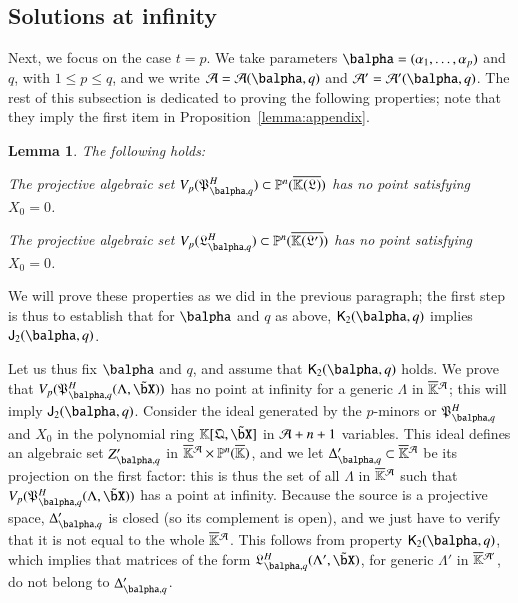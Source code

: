 \documentclass[amsthm]{elsart}
\newtheorem{lemma}[definition]{Lemma}
\begin{document}
\subsection{Solutions at infinity} Next, we focus on the case $t=p$.
We take parameters $\balpha=(\alpha_1,\dots,\alpha_p)$ and $q$, with
$1 \le p \le q$, and we write ${\cal A}={\cal A}(\balpha,q)$ and
${\cal A}'={\cal A}'(\balpha,q)$.  The rest of this subsection is
dedicated to proving the following properties; note that they imply
the first item in Proposition~\ref{lemma:appendix}.

\begin{lemma}The following holds:
\begin{description}[leftmargin=*]
\item[$\assI_2(\balpha,q).$] The projective algebraic set
  $V_p(\mathfrak{P}^H_{\balpha,q}) \subset \P^n(\KKGbar)$ has no point
  satisfying $X_0=0$.
\item[$\assJ_2(\balpha,q).$] The projective algebraic set
  $V_p(\mathfrak{L}^H_{\balpha,q}) \subset \P^n(\KKGpbar)$ has no point
  satisfying $X_0=0$.
\end{description}
\end{lemma}
We will prove these properties as we did in the previous paragraph;
the first step is thus to establish that for $\balpha$ and $q$ as
above, $\assJ_2(\balpha,q)$ implies $\assI_2(\balpha,q)$.

Let us thus fix $\balpha$ and $q$, and assume that
$\assJ_2(\balpha,q)$ holds. We prove that
$V_p(\mathfrak{P}^H_{\balpha,q}(\Lambda,\tilde\bX))$ has no point at
infinity for a generic $\Lambda$ in $\KKbar{}^{\cal A}$; this will
imply $\assI_2(\balpha,q)$. Consider the ideal generated by the
$p$-minors or $\mathfrak{P}^H_{\balpha,q}$ and $X_0$ in the polynomial
ring $\KK[\mathfrak{Q},\tilde\bX]$ in ${\cal A}+n+1$ variables. This
ideal defines an algebraic set $Z'_{\balpha,q}$ in $\KKbar{}^{\cal A}
\times \P^n(\KKbar)$, and we let $\Delta'_{\balpha,q} \subset
\KKbar{}^{\cal A}$ be its projection on the first factor: this is thus
the set of all $\Lambda$ in $\KKbar{}^{\cal A}$ such that
$V_p(\mathfrak{P}^H_{\balpha,q}(\Lambda,\tilde\bX))$ has a point at
infinity. Because the source is a projective space,
$\Delta'_{\balpha,q}$ is closed (so its complement is open), and we
just have to verify that it is not equal to the whole $\KKbar{}^{\cal
  A}$. This follows from property $\assJ_2(\balpha,q)$, which implies
that matrices of the form
$\mathfrak{L}^H_{\balpha,q}(\Lambda',\tilde\bX)$, for generic
$\Lambda'$ in $\KKbar{}^{{\cal A}'}$, do not belong to
$\Delta'_{\balpha,q}$.
\end{document}
